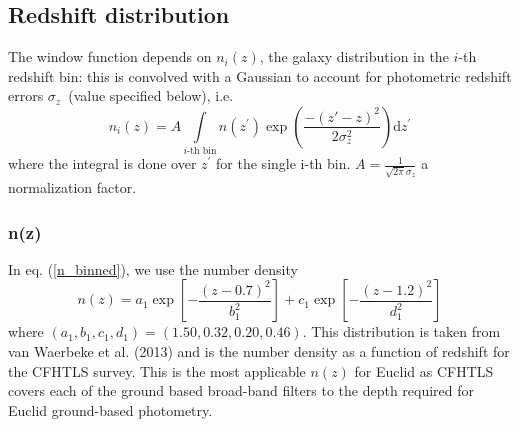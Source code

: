 \subsection{Redshift distribution}
\label{sec:WL_nofz}

The window function depends on $n_{i}(z)$, the galaxy distribution
in the $i$-th redshift bin: this is convolved with a Gaussian to account for photometric
redshift errors $\sigma_{z}$~(value specified below), i.e.~
\begin{equation}
n_{i}(z)=A \int\limits _{i\text{-th bin}}n({z^\prime})\exp\left(\frac{-(z\prime-z)^{2}}{2 \sigma_{z}^{2}}\right)\mathrm{d}{z^\prime}
\label{n_binned}
\end{equation}
where the integral is done over $z^\prime$ for the single i-th bin. 
$A = \frac{1}{\sqrt{2\pi} \sigma_z}$ a normalization factor.

\subsubsection{n(z)}
In eq. (\ref{n_binned}), we use the number density
\begin{equation}
n(z) = a_1\exp\left[-\frac{(z-0.7)^2}{b_1^2}\right]+c_1\exp\left[-\frac{(z-1.2)^2}{d_1^2}\right]
\end{equation}
where $(a_1, b_1, c_1, d_1)=(1.50, 0.32, 0.20, 0.46)$. This distribution is taken from van Waerbeke et al. (2013) and 
is the number density as a function of redshift for the CFHTLS survey. This is the most applicable $n(z)$ for Euclid as 
CFHTLS covers each of the ground based broad-band filters to the depth required for Euclid ground-based photometry. 


